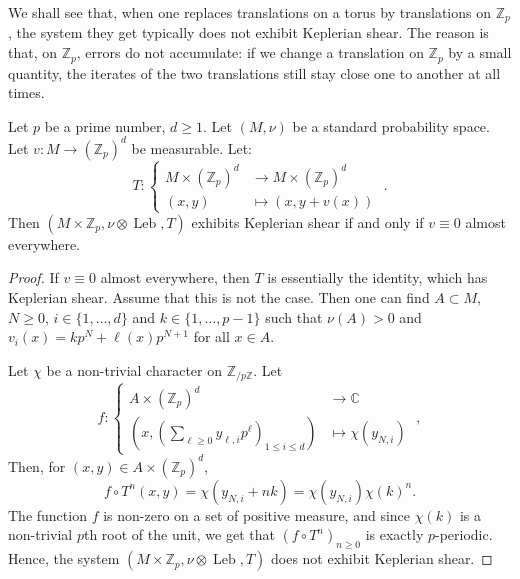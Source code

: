 \documentclass[AHL,Unicode,longabstracts]{cedram}
\DeclareMathOperator{\Leb}{Leb}
\newcommand{\Z}{\mathbb{Z}}
\newcommand{\Cbb}{\mathbb{C}}
\begin{document}

We shall see that, when one replaces translations on a torus by translations on $\Z_p$, the system they get typically does not exhibit Keplerian shear. The reason is that, on $\Z_p$, errors do not accumulate: if we change a translation on $\Z_p$ by a small quantity, the iterates of the two translations still stay close one to another at all times.


\begin{prop}
Let $p$ be a prime number, $d \geq 1$. Let $(M, \nu)$ be a standard probability space. Let $v : M \to (\Z_p)^d$ be measurable. Let:
\[
T :
\begin{cases}
M \times (\Z_p)^d & \to M \times (\Z_p)^d \\
(x,y) & \mapsto (x,y+v(x))
\end{cases}
\;.
\]
Then $(M \times \Z_p, \nu \otimes \Leb, T)$ exhibits Keplerian shear if and only if $v \equiv 0$ almost everywhere.
\end{prop}



\begin{proof}
If $v \equiv 0$ almost everywhere, then $T$ is essentially the identity, which has Keplerian shear. Assume that this is not the case. Then one can find $A \subset M$, $N \geq 0$, $i \in \{1, \ldots, d\}$ and $k \in \{1, \ldots, p-1\}$ such that $\nu(A) >0$ and $v_i (x) = k p^N+\ell(x) p^{N+1}$ for all $x \in A$.


Let $\chi$ be a non-trivial character on $\Z_{/p\Z}$. Let
\[
f : \begin{cases}
A \times (\Z_p)^d & \to \Cbb \\
\left(x,\left(\sum_{\ell \geq 0} y_{\ell,i} p^\ell\right)_{1 \leq i \leq d} \right) & \mapsto \chi(y_{N,i})
\end{cases}
\;,
\]
Then, for $(x,y) \in A \times (\Z_p)^d$,
\[
f \circ T^n (x,y) = \chi(y_{N,i}+nk) = \chi(y_{N,i})\chi(k)^n.
\]
The function $f$ is non-zero on a set of positive measure, and since $\chi(k)$ is a non-trivial $p$th root of the unit, we get that $(f \circ T^n)_{n \geq 0}$ is exactly $p$-periodic. Hence, the system $(M \times \Z_p, \nu \otimes \Leb, T)$ does not exhibit Keplerian shear.
\end{proof}




\end{document}
